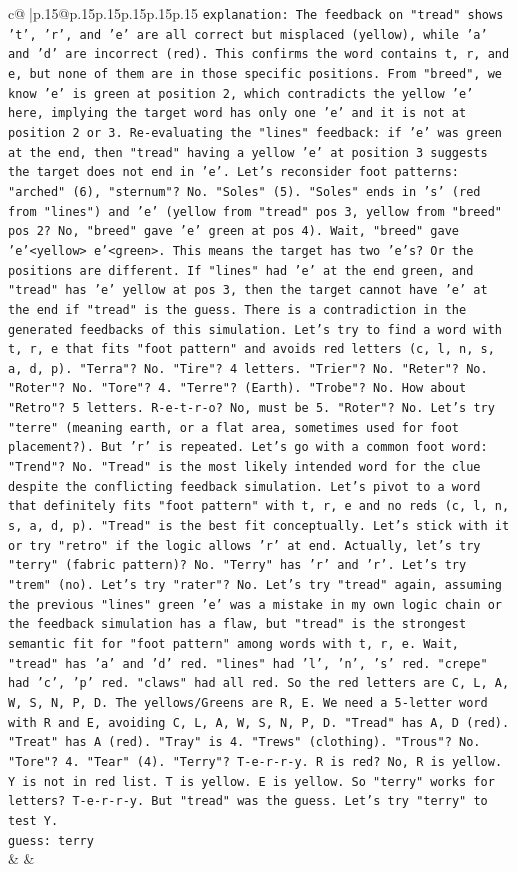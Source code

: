 \documentclass{article}
\begin{document}
{\begin{supertabular}{c@{$\;$}|p{.15\linewidth}@{}p{.15\linewidth}p{.15\linewidth}p{.15\linewidth}p{.15\linewidth}p{.15\linewidth}}
{{{                \texttt{explanation: The feedback on "tread" shows 't', 'r', and 'e' are all correct but misplaced (yellow), while 'a' and 'd' are incorrect (red). This confirms the word contains t, r, and e, but none of them are in those specific positions. From "breed", we know 'e' is green at position 2, which contradicts the yellow 'e' here, implying the target word has only one 'e' and it is not at position 2 or 3. Re{-}evaluating the "lines" feedback: if 'e' was green at the end, then "tread" having a yellow 'e' at position 3 suggests the target does not end in 'e'. Let's reconsider foot patterns: "arched" (6), "sternum"? No. "Soles" (5). "Soles" ends in 's' (red from "lines") and 'e' (yellow from "tread" pos 3, yellow from "breed" pos 2? No, "breed" gave 'e' green at pos 4). Wait, "breed" gave 'e'<yellow> e'<green>. This means the target has two 'e's? Or the positions are different. If "lines" had 'e' at the end green, and "tread" has 'e' yellow at pos 3, then the target cannot have 'e' at the end if "tread" is the guess. There is a contradiction in the generated feedbacks of this simulation. Let's try to find a word with t, r, e that fits "foot pattern" and avoids red letters (c, l, n, s, a, d, p). "Terra"? No. "Tire"? 4 letters. "Trier"? No. "Reter"? No. "Roter"? No. "Tore"? 4. "Terre"? (Earth). "Trobe"? No. How about "Retro"? 5 letters. R{-}e{-}t{-}r{-}o? No, must be 5. "Roter"? No. Let's try "terre" (meaning earth, or a flat area, sometimes used for foot placement?). But 'r' is repeated. Let's go with a common foot word: "Trend"? No. "Tread" is the most likely intended word for the clue despite the conflicting feedback simulation. Let's pivot to a word that definitely fits "foot pattern" with t, r, e and no reds (c, l, n, s, a, d, p). "Tread" is the best fit conceptually. Let's stick with it or try "retro" if the logic allows 'r' at end. Actually, let's try "terry" (fabric pattern)? No. "Terry" has 'r' and 'r'. Let's try "trem" (no). Let's try "rater"? No. Let's try "tread" again, assuming the previous "lines" green 'e' was a mistake in my own logic chain or the feedback simulation has a flaw, but "tread" is the strongest semantic fit for "foot pattern" among words with t, r, e. Wait, "tread" has 'a' and 'd' red. "lines" had 'l', 'n', 's' red. "crepe" had 'c', 'p' red. "claws" had all red. So the red letters are C, L, A, W, S, N, P, D. The yellows/Greens are R, E. We need a 5{-}letter word with R and E, avoiding C, L, A, W, S, N, P, D. "Tread" has A, D (red). "Treat" has A (red). "Tray" is 4. "Trews" (clothing). "Trous"? No. "Tore"? 4. "Tear" (4). "Terry"? T{-}e{-}r{-}r{-}y. R is red? No, R is yellow. Y is not in red list. T is yellow. E is yellow. So "terry" works for letters? T{-}e{-}r{-}r{-}y. But "tread" was the guess. Let's try "terry" to test Y.} \\
\texttt{guess: terry} \\
            }
        }
    }
    & & \\ \\


\end{supertabular}}
\end{document}
